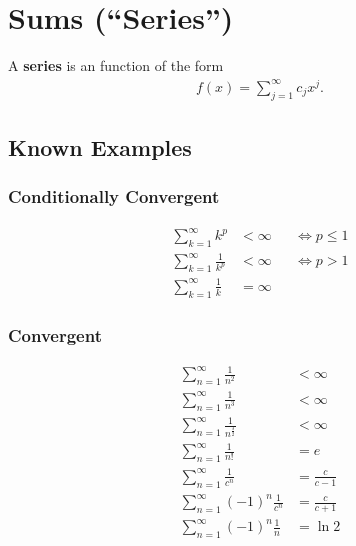 \hypertarget{sums-series}{%
\section{Sums (``Series'')}\label{sums-series}}

\begin{definition}[Series]

A \textbf{series} is an function of the form
\begin{align*}  
f(x) = \sum_{j=1}^\infty c_j x^j
.\end{align*}

\end{definition}

\hypertarget{known-examples-1}{%
\subsection{Known Examples}\label{known-examples-1}}

\hypertarget{conditionally-convergent}{%
\subsubsection{Conditionally
Convergent}\label{conditionally-convergent}}

\begin{align*}
\sum_{k=1}^\infty k^p &< \infty 
&&\iff p \leq 1 \\
\sum_{k=1}^\infty \frac{1}{k^p} &< \infty 
&&\iff p > 1 \\
\sum_{k=1}^\infty \frac{1}{k} &= \infty 
&&
\end{align*}

\hypertarget{convergent}{%
\subsubsection{Convergent}\label{convergent}}

\begin{align*}
\sum_{n=1}^\infty \frac{1}{n^2}           & < \infty \\
\sum_{n=1}^\infty \frac{1}{n^3}           & < \infty \\
\sum_{n=1}^\infty \frac{1}{n^\frac{3}{2}} & < \infty \\
\sum_{n=1}^\infty \frac{1}{n!}            & = e \\
\sum_{n=1}^\infty \frac{1}{c^n}           & = \frac{c}{c-1} \\
\sum_{n=1}^\infty (-1)^n \frac{1}{c^n}    & = \frac{c}{c+1} \\
\sum_{n=1}^\infty (-1)^n \frac{1}{n}      & = \ln 2
\end{align*}

